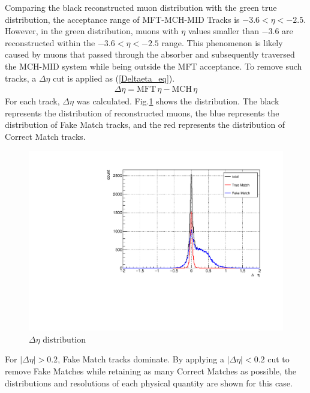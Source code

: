             Comparing the black reconstructed muon distribution with the green true distribution, the acceptance range of MFT-MCH-MID Tracks is \(-3.6 < \eta < -2.5\). However, in the green distribution, muons with \(\eta\) values smaller than \(-3.6\) are reconstructed within the \(-3.6 < \eta < -2.5\) range. This phenomenon is likely caused by muons that passed through the absorber and subsequently traversed the MCH-MID system while being outside the MFT acceptance. 
            To remove such tracks, a \(\Delta \eta\) cut is applied as (\ref{Deltaeta_eq}).
            \begin{eqnarray}
                \label{Deltaeta_eq}
                \Delta \eta = \text{MFT} \, \eta - \text{MCH} \, \eta  
            \end{eqnarray}
            For each track, \(\Delta \eta\) was calculated. Fig.\ref{Analysis:Matching:DeltaEta} shows the distribution. The black represents the distribution of reconstructed muons, the blue represents the distribution of Fake Match tracks, and the red represents the distribution of Correct Match tracks.
            \begin{figure}[H]
                \centering
                \includegraphics[keepaspectratio, scale=0.5]{fig/3_5_6_etacutno_deltaeta.pdf} %
                \caption{$\Delta \eta$ distribution}
                \label{Analysis:Matching:DeltaEta}
            \end{figure}
            For \( |\Delta \eta| > 0.2 \), Fake Match tracks dominate. By applying a \( |\Delta \eta| < 0.2 \) cut to remove Fake Matches while retaining as many Correct Matches as possible, the distributions and resolutions of each physical quantity are shown for this case.

